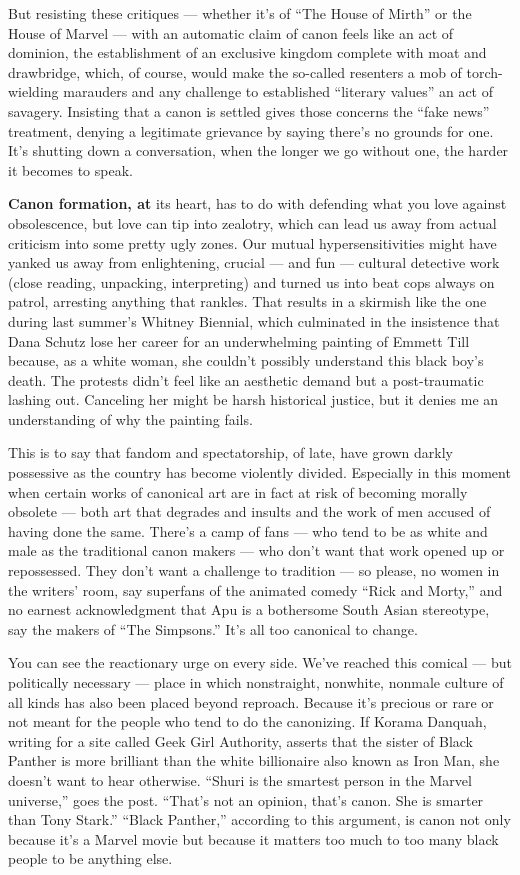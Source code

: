 But resisting these critiques --- whether it's of ``The House of Mirth''
or the House of Marvel --- with an automatic claim of canon feels like
an act of dominion, the establishment of an exclusive kingdom complete
with moat and drawbridge, which, of course, would make the so-called
resenters a mob of torch-wielding marauders and any challenge to
established ``literary values'' an act of savagery. Insisting that a
canon is settled gives those concerns the ``fake news'' treatment,
denying a legitimate grievance by saying there's no grounds for one.
It's shutting down a conversation, when the longer we go without one,
the harder it becomes to speak.

\textbf{Canon formation, at} its heart, has to do with defending what
you love against obsolescence, but love can tip into zealotry, which can
lead us away from actual criticism into some pretty ugly zones. Our
mutual hypersensitivities might have yanked us away from enlightening,
crucial --- and fun --- cultural detective work (close reading,
unpacking, interpreting) and turned us into beat cops always on patrol,
arresting anything that rankles. That results in a skirmish like the one
during last summer's Whitney Biennial, which culminated in the
insistence that Dana Schutz lose her career for an underwhelming
painting of Emmett Till because, as a white woman, she couldn't possibly
understand this black boy's death. The protests didn't feel like an
aesthetic demand but a post-traumatic lashing out. Canceling her might
be harsh historical justice, but it denies me an understanding of why
the painting fails.

This is to say that fandom and spectatorship, of late, have grown darkly
possessive as the country has become violently divided. Especially in
this moment when certain works of canonical art are in fact at risk of
becoming morally obsolete --- both art that degrades and insults and the
work of men accused of having done the same. There's a camp of fans ---
who tend to be as white and male as the traditional canon makers --- who
don't want that work opened up or repossessed. They don't want a
challenge to tradition --- so please, no women in the writers' room, say
superfans of the animated comedy ``Rick and Morty,'' and no earnest
acknowledgment that Apu is a bothersome South Asian stereotype, say the
makers of ``The Simpsons.'' It's all too canonical to change.

You can see the reactionary urge on every side. We've reached this
comical --- but politically necessary --- place in which nonstraight,
nonwhite, nonmale culture of all kinds has also been placed beyond
reproach. Because it's precious or rare or not meant for the people who
tend to do the canonizing. If Korama Danquah, writing for a site called
Geek Girl Authority, asserts that the sister of Black Panther is more
brilliant than the white billionaire also known as Iron Man, she doesn't
want to hear otherwise. ``Shuri is the smartest person in the Marvel
universe,'' goes the post. ``That's not an opinion, that's canon. She is
smarter than Tony Stark.'' ``Black Panther,'' according to this
argument, is canon not only because it's a Marvel movie but because it
matters too much to too many black people to be anything else.

